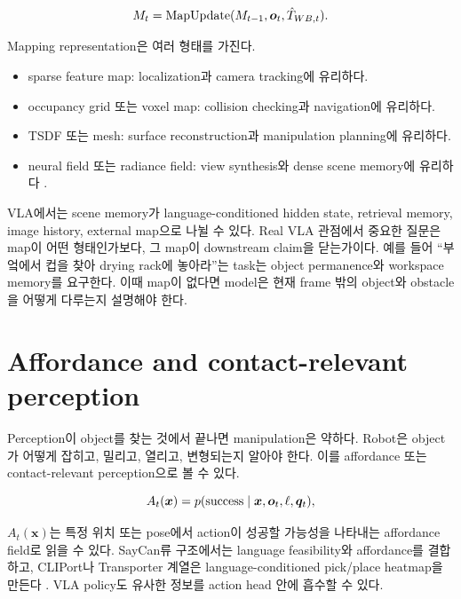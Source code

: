 \begin{equation}
  M_t =
  \mathrm{MapUpdate}(M_{t-1}, \bm{o}_t, \hat{T}_{WB,t}).
  \label{eq:map-update}
\end{equation}

Mapping representation은 여러 형태를 가진다.

\begin{itemize}
  \item sparse feature map: localization과 camera tracking에 유리하다.
  \item occupancy grid 또는 voxel map: collision checking과 navigation에 유리하다.
  \item TSDF 또는 mesh: surface reconstruction과 manipulation planning에 유리하다.
  \item neural field 또는 radiance field: view synthesis와 dense scene memory에 유리하다 \cite{mildenhall2020nerf}.
\end{itemize}

VLA에서는 scene memory가 language-conditioned hidden state, retrieval memory, image history, external map으로 나뉠 수 있다. Real VLA 관점에서 중요한 질문은 map이 어떤 형태인가보다, 그 map이 downstream claim을 닫는가이다. 예를 들어 ``부엌에서 컵을 찾아 drying rack에 놓아라''는 task는 object permanence와 workspace memory를 요구한다. 이때 map이 없다면 model은 현재 frame 밖의 object와 obstacle을 어떻게 다루는지 설명해야 한다.

\section{Affordance and contact-relevant perception}

Perception이 object를 찾는 것에서 끝나면 manipulation은 약하다. Robot은 object가 어떻게 잡히고, 밀리고, 열리고, 변형되는지 알아야 한다. 이를 affordance 또는 contact-relevant perception으로 볼 수 있다.

\begin{equation}
  A_t(\bm{x}) =
  p(\text{success}\mid \bm{x}, \bm{o}_t, \ell, \bm{q}_t),
  \label{eq:affordance-field}
\end{equation}

$A_t(\bm{x})$는 특정 위치 또는 pose에서 action이 성공할 가능성을 나타내는 affordance field로 읽을 수 있다. SayCan류 구조에서는 language feasibility와 affordance를 결합하고, CLIPort나 Transporter 계열은 language-conditioned pick/place heatmap을 만든다 \cite{saycan2022,cliport2022,florence2021transporter}. VLA policy도 유사한 정보를 action head 안에 흡수할 수 있다.

